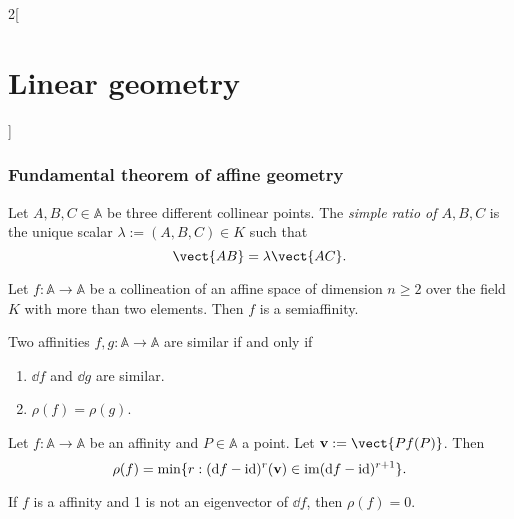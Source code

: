 \documentclass[../../../main.tex]{subfiles}
\begin{document}
\begin{multicols}{2}[\section{Linear geometry}]
    \subsubsection*{Fundamental theorem of affine geometry}
    \begin{definition}
        Let $A,B,C\in\mathbb{A}$ be three different collinear points. The \textit{simple ratio of $A,B,C$} is the unique scalar $\lambda:=(A,B,C)\in K$ such that $$\vect{AB}=\lambda\vect{AC}.$$
        \begin{theorem}
            Let $f:\mathbb{A}\rightarrow\mathbb{A}$ be a collineation of an affine space of dimension $n\geq 2$ over the field $K$ with more than two elements. Then $f$ is a semiaffinity.
        \end{theorem}
        \begin{prop}
            Two affinities $f,g:\mathbb{A}\rightarrow\mathbb{A}$ are similar if and only if
            \begin{enumerate}
                \item $\dd f$ and $\dd g$ are similar.
                \item $\rho(f)=\rho(g)$.
            \end{enumerate}
        \end{prop}
        \begin{theorem}
            Let $f:\mathbb{A}\rightarrow\mathbb{A}$ be an affinity and $P\in\mathbb{A}$ a point. Let $\mathblack{v}:=\vect{Pf(P)}$. Then $$\rho(f)=\min\{r:(\dd f-\mathrm{id})^r(\vb{v})\in\operatorname{im}(\dd f-\mathrm{id})^{r+1}\}.$$
        \end{theorem}
        \begin{corollary}
            If $f$ is a affinity and 1 is not an eigenvector of $\dd f$, then $\rho(f)=0$.
        \end{corollary}
    \end{definition}

\end{multicols}
\end{document}
